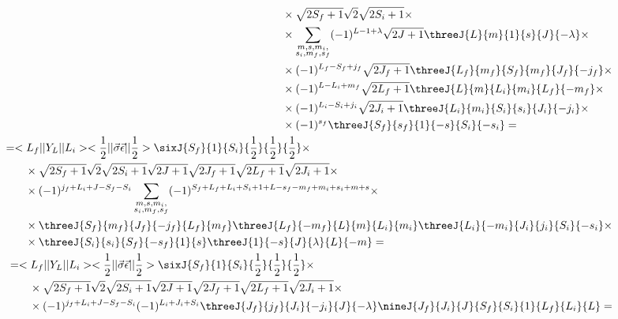 \begin{align}
\begin{split}
        &\qquad\times \sqrt{2S_f+1} \sqrt{2} \sqrt{2S_i + 1} \times \\
        &\qquad\times \sum_{\substack{m, s, m_i,\\ s_i, m_f, s_f}} (-1)^{L-1+\lambda} \sqrt{2J+1} \threeJ{L}{m}{1}{s}{J}{-\lambda} \times \\
        &\qquad\times (-1)^{L_f - S_f + j_f} \sqrt{2J_f+1} \threeJ{L_f}{m_f}{S_f}{m_f}{J_f}{-j_f} \times \\
        &\qquad\times (-1)^{L-L_i+m_f} \sqrt{2L_f+1} \threeJ{L}{m}{L_i}{m_i}{L_f}{-m_f} \times \\
        &\qquad\times (-1)^{L_i - S_i + j_i} \sqrt{2J_i+1} \threeJ{L_i}{m_i}{S_i}{s_i}{J_i}{-j_i} \times \\
        &\qquad\times (-1)^{s_f} \threeJ{S_f}{s_f}{1}{-s}{S_i}{-s_i} =
    \end{split}\\
    \begin{split}
        &= <L_f|| Y_L ||L_i> <\frac{1}{2}|| \vec{\sigma}\vec{\epsilon} ||\frac{1}{2}> \sixJ{S_f}{1}{S_i}{\frac{1}{2}}{\frac{1}{2}}{\frac{1}{2}} \times \\
        &\qquad\times \sqrt{2S_f+1} \sqrt{2} \sqrt{2S_i + 1} \sqrt{2J+1} \sqrt{2J_f+1} \sqrt{2L_f+1} \sqrt{2J_i+1} \times \\
        &\qquad\times (-1)^{j_f+L_i+J-S_f-S_i} \sum_{\substack{m, s, m_i,\\ s_i, m_f, s_f}} (-1)^{S_f+L_f+L_i+S_i+1+L-s_f-m_f+m_i+s_i+m+s} \times \\
        &\qquad\times \threeJ{S_f}{m_f}{J_f}{-j_f}{L_f}{m_f} \threeJ{L_f}{-m_f}{L}{m}{L_i}{m_i} \threeJ{L_i}{-m_i}{J_i}{j_i}{S_i}{-s_i} \times \\
        &\qquad\times \threeJ{S_i}{s_i}{S_f}{-s_f}{1}{s} \threeJ{1}{-s}{J}{\lambda}{L}{-m} =
    \end{split}\\
    \begin{split}
        &= <L_f|| Y_L ||L_i> <\frac{1}{2}|| \vec{\sigma}\vec{\epsilon} ||\frac{1}{2}> \sixJ{S_f}{1}{S_i}{\frac{1}{2}}{\frac{1}{2}}{\frac{1}{2}} \times \\
        &\qquad\times \sqrt{2S_f+1} \sqrt{2} \sqrt{2S_i + 1} \sqrt{2J+1} \sqrt{2J_f+1} \sqrt{2L_f+1} \sqrt{2J_i+1} \times \\
        &\qquad\times (-1)^{j_f+L_i+J-S_f-S_i} (-1)^{L_i+J_i+S_i} \threeJ{J_f}{j_f}{J_i}{-j_i}{J}{-\lambda} \nineJ{J_f}{J_i}{J}{S_f}{S_i}{1}{L_f}{L_i}{L} =
    \end{split}\\

\end{align}
